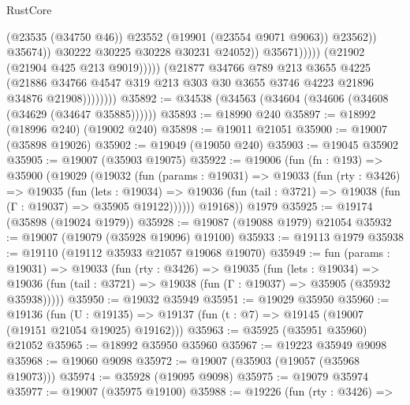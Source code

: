 \begin{lexlean}{RustCore}
\begin{coremodule}
                                            (@23535 (@34750 @46))
                                            @23552
                                            (@19901 (@23554 @9071 @9063))
                                            @23562))
                                        @35674))
                                    @30222
                                    @30225
                                    @30228
                                    @30231
                                    @24052))
                                @35671)))))
                      (@21902 (@21904 @425 @213 @9019)))))
                (@21877
                  @34766
                  @789
                  @213
                  @3655
                  @4225
                  (@21886
                    @34766
                    @4547
                    @319
                    @213
                    @303
                    @30
                    @3655
                    @3746
                    @4223
                    @21896
                    @34876
                    @21908))))))))
@35892 := @34538 (@34563 (@34604 (@34606 (@34608 (@34629 (@34647 @35885))))))
@35893 := @18990 @240
@35897 := @18992 (@18996 @240) (@19002 @240)
@35898 := @19011 @21051
@35900 := @19007 (@35898 @19026)
@35902 := @19049 (@19050 @240)
@35903 := @19045 @35902
@35905 := @19007 (@35903 @19075)
@35922 := @19006
    (fun (fn : @193) =>
    @35900
      (@19029
        (@19032
          (fun (params : @19031) =>
          @19033
            (fun (rty : @3426) =>
            @19035
              (fun (lets : @19034) =>
              @19036 (fun (tail : @3721) => @19038 (fun (Γ : @19037) => @35905 @19122))))))
        @19168))
    @1979
@35925 := @19174 (@35898 (@19024 @1979))
@35928 := @19087 (@19088 @1979) @21054
@35932 := @19007 (@19079 (@35928 @19096) @19100)
@35933 := @19113 @1979
@35938 := @19110 (@19112 @35933 @21057 @19068 @19070)
@35949 := fun (params : @19031) =>
  @19033
    (fun (rty : @3426) =>
    @19035
      (fun (lets : @19034) =>
      @19036 (fun (tail : @3721) => @19038 (fun (Γ : @19037) => @35905 (@35932 @35938)))))
@35950 := @19032 @35949
@35951 := @19029 @35950
@35960 := @19136
    (fun (U : @19135) => @19137 (fun (t : @7) => @19145 (@19007 (@19151 @21054 @19025) @19162)))
@35963 := @35925 (@35951 @35960) @21052
@35965 := @18992 @35950 @35960
@35967 := @19223 @35949 @9098
@35968 := @19060 @9098
@35972 := @19007 (@35903 (@19057 (@35968 @19073)))
@35974 := @35928 (@19095 @9098)
@35975 := @19079 @35974
@35977 := @19007 (@35975 @19100)
@35988 := @19226
    (fun (rty : @3426) =>

\end{coremodule}
\end{lexlean}
